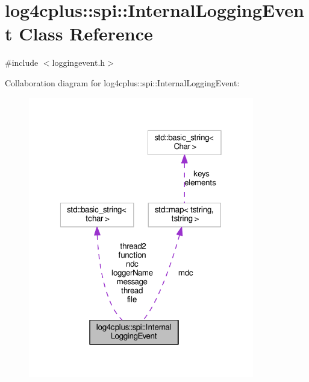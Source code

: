 \hypertarget{classlog4cplus_1_1spi_1_1InternalLoggingEvent}{\section{log4cplus\-:\-:spi\-:\-:Internal\-Logging\-Event Class Reference}
\label{classlog4cplus_1_1spi_1_1InternalLoggingEvent}
}


{\ttfamily \#include $<$loggingevent.\-h$>$}



Collaboration diagram for log4cplus\-:\-:spi\-:\-:Internal\-Logging\-Event\-:
\nopagebreak
\begin{figure}[H]
\begin{center}
\leavevmode
\includegraphics[width=279pt]{classlog4cplus_1_1spi_1_1InternalLoggingEvent__coll__graph}
\end{center}
\end{figure}
